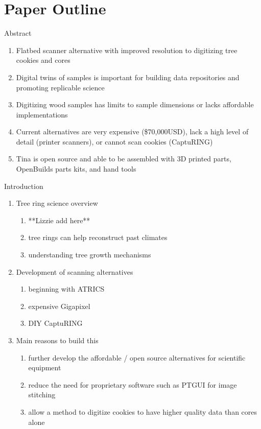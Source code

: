 \documentclass{article}
\begin{document}
\section {Paper Outline}
\begin{outline}[enumerate]

\1 Abstract
\begin{enumerate}
	\item Flatbed scanner alternative with improved resolution to digitizing tree cookies and cores
	\item Digital twins of samples is important for building data repositories and promoting replicable science
	\item Digitizing wood samples has limits to sample dimensions or lacks affordable implementations
	\item Current alternatives are very expensive (\$70,000USD), lack a high level of detail (printer scanners), or cannot scan cookies (CaptuRING)
	\item Tina is open source and able to be assembled with 3D printed parts, OpenBuilds parts kits, and hand tools
\end{enumerate}
\item Introduction
	\begin{enumerate}
	\item Tree ring science overview
		\begin{enumerate}
		\item **Lizzie add here**
		\item tree rings can help reconstruct past climates 
		\item understanding tree growth mechanisms
		\end{enumerate}
	\item Development of scanning alternatives
		\begin{enumerate}
		\item beginning with ATRICS
		\item expensive Gigapixel
		\item DIY CaptuRING
		\end{enumerate}
	\item Main reasons to build this 
		\begin{enumerate}
		\item further develop the affordable / open source alternatives for scientific equipment
		\item reduce the need for proprietary software such as PTGUI for image stitching
		\item allow a method to digitize cookies to have higher quality data than cores alone

\end{enumerate}
\end{enumerate}
\end{outline}
\end{document}
